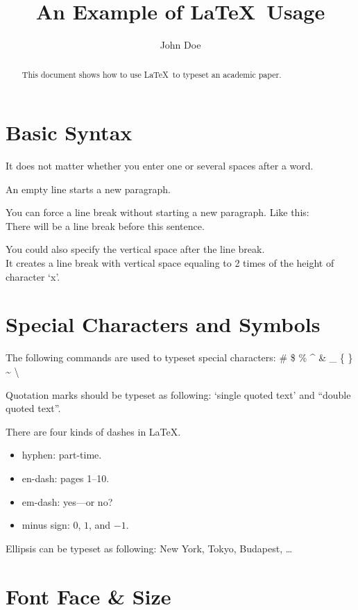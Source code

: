 \documentclass[conference]{IEEEtran}
\title{An Example of \LaTeX~Usage}
\author{John Doe}
\begin{document}
\maketitle

\begin{abstract}
  This document shows how to use \LaTeX~to typeset an academic paper.
\end{abstract}

\section{Basic Syntax}

It does not matter whether
you enter one or several
spaces        after a word.

An empty line starts a new
paragraph.

You can force a line break without starting a new paragraph. Like this: \\
There will be a line break before this sentence.

You could also specify the vertical space after the line break. \\ [2ex]
It creates a line break with vertical space equaling to 2 times of the height of character `x'.

\section{Special Characters and Symbols}

The following commands are used to typeset special characters:
\# \$ \% \^{} \& \_ \{ \} \~{} \textbackslash

Quotation marks should be typeset as following: `single quoted text' and ``double quoted text''.

There are four kinds of dashes in \LaTeX{}.
\begin{itemize}
  \item hyphen: part-time.
  \item en-dash: pages 1--10.
  \item em-dash: yes---or no?
  \item minus sign: $0$, $1$, and $-1$.
\end{itemize}

Ellipsis can be typeset as following: New York, Tokyo, Budapest, \ldots

\section{Font Face \& Size}
\end{document}
